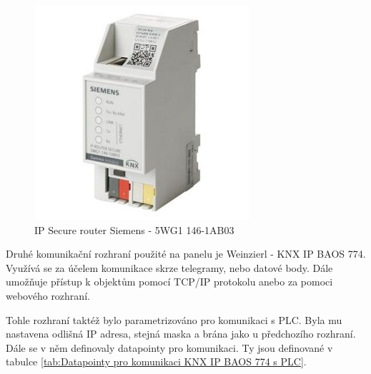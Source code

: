 \begin{figure}[!ht]
  \begin{center}
    \includegraphics[scale=0.55]{obrazky/Siemens router.jpg}
  \end{center}
  \caption[IP Secure router Siemens - 5WG1 146-1AB03 \cite{Siemens IP}]{IP Secure router Siemens - 5WG1 146-1AB03 \cite{Siemens IP}}
  \label{fig:IP Secure router Siemens - 5WG1 146-1AB03}
\end{figure}

Druhé komunikační rozhraní použité na panelu je Weinzierl - KNX IP BAOS 774. Využívá se za účelem komunikace skrze telegramy, nebo datové body. Dále umožňuje přístup k objektům pomocí TCP/IP protokolu anebo za pomoci webového rozhraní. \cite{Weinzier}

Tohle rozhraní taktéž bylo parametrizováno pro komunikaci s PLC. Byla mu nastavena odlišná IP adresa, stejná maska a brána jako u předchozího rozhraní. Dále se v něm definovaly datapointy pro komunikaci. Ty jsou definované v tabulce \ref{tab:Datapointy pro komunikaci KNX IP BAOS 774 s PLC}.

